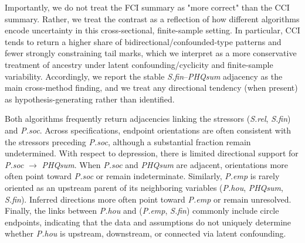 \documentclass[
]{article}
\begin{document}
\textcolor{BrickRed}{Importantly, we do not treat the FCI summary as "more correct" than the CCI summary. Rather, we treat the contrast as a reflection of how different algorithms encode uncertainty in this cross-sectional, finite-sample setting. In particular, CCI tends to return a higher share of bidirectional/confounded-type patterns and fewer strongly constraining tail marks, which we interpret as a more conservative treatment of ancestry under latent confounding/cyclicity and finite-sample variability. Accordingly, we report the stable \textit{S.fin}–\textit{PHQsum} adjacency as the main cross-method finding, and we treat any directional tendency (when present) as hypothesis-generating rather than identified.}

\textcolor{BrickRed}{Both algorithms frequently return adjacencies linking the stressors (\textit{S.rel}, \textit{S.fin}) and \textit{P.soc}. Across specifications, endpoint orientations are often consistent with the stressors preceding \textit{P.soc}, although a substantial fraction remain undetermined. With respect to depression, there is limited directional support for \textit{P.soc} $\rightarrow$ \textit{PHQsum}. When \textit{P.soc} and \textit{PHQsum} are adjacent, orientations more often point toward \textit{P.soc} or remain indeterminate. Similarly, \textit{P.emp} is rarely oriented as an upstream parent of its neighboring variables (\textit{P.hou}, \textit{PHQsum}, \textit{S.fin}). Inferred directions more often point toward \textit{P.emp} or remain unresolved. Finally, the links between \textit{P.hou} and (\textit{P.emp}, \textit{S.fin}) commonly include circle endpoints, indicating that the data and assumptions do not uniquely determine whether \textit{P.hou} is upstream, downstream, or connected via latent confounding.}
\end{document}
